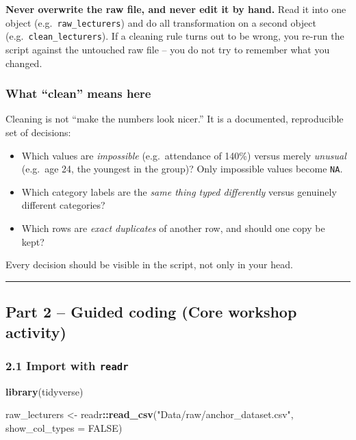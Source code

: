 \documentclass[11pt]{article}
\newenvironment{Shaded}{\begin{snugshade}}{\end{snugshade}}
\newcommand{\AttributeTok}[1]{\textcolor[rgb]{0.13,0.29,0.53}{#1}}
\newcommand{\ConstantTok}[1]{\textcolor[rgb]{0.56,0.35,0.01}{#1}}
\newcommand{\FunctionTok}[1]{\textcolor[rgb]{0.13,0.29,0.53}{\textbf{#1}}}
\newcommand{\NormalTok}[1]{#1}
\newcommand{\OtherTok}[1]{\textcolor[rgb]{0.56,0.35,0.01}{#1}}
\newcommand{\SpecialCharTok}[1]{\textcolor[rgb]{0.81,0.36,0.00}{\textbf{#1}}}
\newcommand{\StringTok}[1]{\textcolor[rgb]{0.31,0.60,0.02}{#1}}
\providecommand{\tightlist}{%
  \setlength{\itemsep}{0pt}\setlength{\parskip}{0pt}}
\begin{document}
\textbf{Never overwrite the raw file, and never edit it by hand.} Read
it into one object (e.g.~\texttt{raw\_lecturers}) and do all
transformation on a second object (e.g.~\texttt{clean\_lecturers}). If a
cleaning rule turns out to be wrong, you re-run the script against the
untouched raw file -- you do not try to remember what you changed.

\hypertarget{what-clean-means-here}{%
\subsubsection{What ``clean'' means here}\label{what-clean-means-here}}

Cleaning is not ``make the numbers look nicer.'' It is a documented,
reproducible set of decisions:

\begin{itemize}
\tightlist
\item
  Which values are \emph{impossible} (e.g.~attendance of 140\%) versus
  merely \emph{unusual} (e.g.~age 24, the youngest in the group)? Only
  impossible values become \texttt{NA}.
\item
  Which category labels are the \emph{same thing typed differently}
  versus genuinely different categories?
\item
  Which rows are \emph{exact duplicates} of another row, and should one
  copy be kept?
\end{itemize}

Every decision should be visible in the script, not only in your head.

\begin{center}\rule{0.5\linewidth}{0.5pt}\end{center}

\hypertarget{part-2-guided-coding-core-workshop-activity}{%
\subsection{Part 2 -- Guided coding (Core workshop
activity)}\label{part-2-guided-coding-core-workshop-activity}}

\hypertarget{import-with-readr}{%
\subsubsection{\texorpdfstring{2.1 Import with
\texttt{readr}}{2.1 Import with readr}}\label{import-with-readr}}

\begin{Shaded}
\begin{Highlighting}[]
\FunctionTok{library}\NormalTok{(tidyverse)}

\NormalTok{raw\_lecturers }\OtherTok{\textless{}{-}}\NormalTok{ readr}\SpecialCharTok{::}\FunctionTok{read\_csv}\NormalTok{(}\StringTok{"Data/raw/anchor\_dataset.csv"}\NormalTok{, }\AttributeTok{show\_col\_types =} \ConstantTok{FALSE}\NormalTok{)}
\end{Highlighting}
\end{Shaded}
\end{document}
